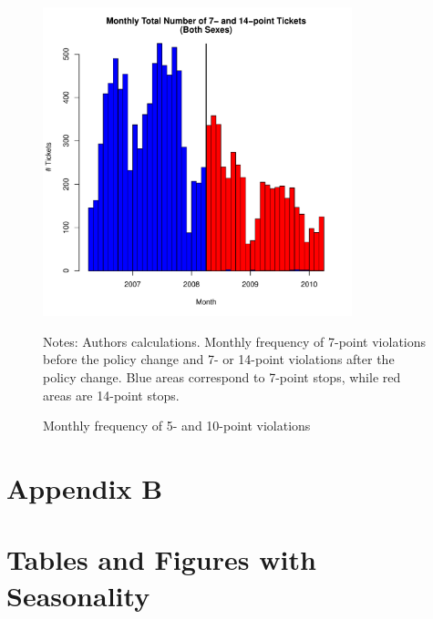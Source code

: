 \begin{figure}
\centering
\includegraphics[width=0.8\textwidth]{../Figures/num_pts_7_14_all_orig.pdf}
\caption{Monthly frequency of 5- and 10-point violations }
Notes: Authors calculations. Monthly frequency of 7-point violations before the policy change and 7- or 14-point violations after the policy change. Blue areas correspond to 7-point stops, while red areas are 14-point stops.
\label{fig:num_pts_7_14_all}
\end{figure}


















\clearpage
\pagebreak

\section*{Appendix B}
\vspace{3.0in}

\section*{Tables and Figures with Seasonality}
\label{sec:Appendix}

